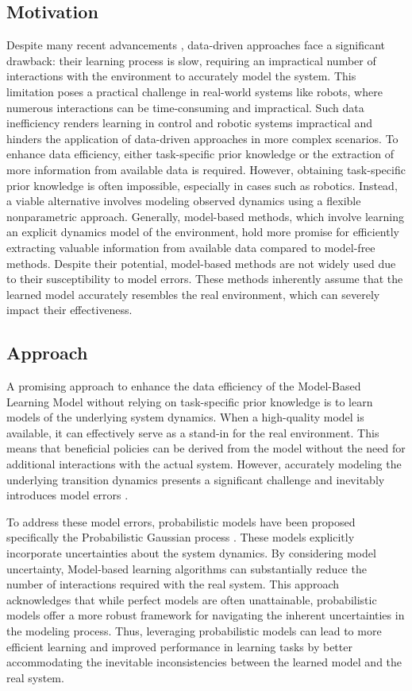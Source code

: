 \subsection{Motivation}
Despite many recent advancements \cite{silver2016mastering} \cite{yahya2016collective}, data-driven approaches face a significant drawback: their learning process is slow, requiring an impractical number of interactions with the environment to accurately model the system. This limitation poses a practical challenge in real-world systems like robots, where numerous interactions can be time-consuming and impractical. Such data inefficiency renders learning in control and robotic systems impractical and hinders the application of data-driven approaches in more complex scenarios. To enhance data efficiency, either task-specific prior knowledge or the extraction of more information from available data is required. However, obtaining task-specific prior knowledge is often impossible, especially in cases such as robotics. Instead, a viable alternative involves modeling observed dynamics using a flexible nonparametric approach. Generally, model-based methods, which involve learning an explicit dynamics model of the environment, hold more promise for efficiently extracting valuable information from available data compared to model-free methods. Despite their potential, model-based methods are not widely used due to their susceptibility to model errors. These methods inherently assume that the learned model accurately resembles the real environment, which can severely impact their effectiveness.


\subsection{Approach}
A promising approach to enhance the data efficiency of the Model-Based Learning Model without relying on task-specific prior knowledge is to learn models of the underlying system dynamics. When a high-quality model is available, it can effectively serve as a stand-in for the real environment. This means that beneficial policies can be derived from the model without the need for additional interactions with the actual system. However, accurately modeling the underlying transition dynamics presents a significant challenge and inevitably introduces model errors \cite{schneider1997exploiting}.

To address these model errors, probabilistic models have been proposed specifically the Probabilistic Gaussian process \cite{deisenroth2011pilco}. These models explicitly incorporate uncertainties about the system dynamics. By considering model uncertainty, Model-based learning algorithms can substantially reduce the number of interactions required with the real system. This approach acknowledges that while perfect models are often unattainable, probabilistic models offer a more robust framework for navigating the inherent uncertainties in the modeling process. Thus, leveraging probabilistic models can lead to more efficient learning and improved performance in learning tasks by better accommodating the inevitable inconsistencies between the learned model and the real system\cite{kamthe2018}.


